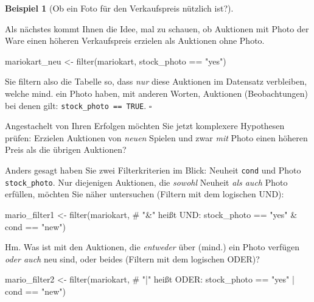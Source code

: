 \documentclass[
  letterpaper,
  twoside,
  open=any]{scrbook}
\newenvironment{Shaded}{\begin{snugshade}}{\end{snugshade}}
\newcommand{\CommentTok}[1]{\textcolor[rgb]{0.37,0.37,0.37}{#1}}
\newcommand{\FunctionTok}[1]{\textcolor[rgb]{0.28,0.35,0.67}{#1}}
\newcommand{\NormalTok}[1]{\textcolor[rgb]{0.00,0.23,0.31}{#1}}
\newcommand{\OtherTok}[1]{\textcolor[rgb]{0.00,0.23,0.31}{#1}}
\newcommand{\SpecialCharTok}[1]{\textcolor[rgb]{0.37,0.37,0.37}{#1}}
\newcommand{\StringTok}[1]{\textcolor[rgb]{0.13,0.47,0.30}{#1}}
\theoremstyle{definition}
\theoremstyle{definition}
\newtheorem{example}{Beispiel}[chapter]
\theoremstyle{definition}
\theoremstyle{remark}
\begin{document}
\begin{example}[Ob ein Foto für den Verkaufspreis nützlich
ist?]\protect\hypertarget{exm-filter}{}\label{exm-filter}

Als nächstes kommt Ihnen die Idee, mal zu schauen, ob Auktionen mit
Photo der Ware einen höheren Verkaufspreis erzielen als Auktionen ohne
Photo.

\begin{Shaded}
\begin{Highlighting}[]
\NormalTok{mariokart\_neu }\OtherTok{\textless{}{-}} \FunctionTok{filter}\NormalTok{(mariokart, stock\_photo }\SpecialCharTok{==} \StringTok{"yes"}\NormalTok{)}
\end{Highlighting}
\end{Shaded}

Sie filtern also die Tabelle so, dass \emph{nur} diese Auktionen im
Datensatz verbleiben, welche mind. ein Photo haben, mit anderen Worten,
Auktionen (Beobachtungen) bei denen gilt:
\texttt{stock\_photo\ ==\ TRUE}. \(\square\)

\end{example}

Angestachelt von Ihren Erfolgen möchten Sie jetzt komplexere Hypothesen
prüfen: Erzielen Auktionen von \emph{neuen} Spielen und zwar \emph{mit}
Photo einen höheren Preis als die übrigen Auktionen?

Anders gesagt haben Sie zwei Filterkriterien im Blick: Neuheit
\texttt{cond} und Photo \texttt{stock\_photo}. Nur diejenigen Auktionen,
die \emph{sowohl} Neuheit \emph{als auch} Photo erfüllen, möchten Sie
näher untersuchen (Filtern mit dem logischen UND):

\begin{Shaded}
\begin{Highlighting}[]
\NormalTok{mario\_filter1 }\OtherTok{\textless{}{-}} 
  \FunctionTok{filter}\NormalTok{(mariokart,  }\CommentTok{\# "\&" heißt UND:}
\NormalTok{         stock\_photo }\SpecialCharTok{==} \StringTok{"yes"} \SpecialCharTok{\&}\NormalTok{ cond }\SpecialCharTok{==} \StringTok{"new"}\NormalTok{)}
\end{Highlighting}
\end{Shaded}

Hm. Was ist mit den Auktionen, die \emph{entweder} über (mind.) ein
Photo verfügen \emph{oder auch} neu sind, oder beides (Filtern mit dem
logischen ODER)?

\begin{Shaded}
\begin{Highlighting}[]
\NormalTok{mario\_filter2 }\OtherTok{\textless{}{-}} 
  \FunctionTok{filter}\NormalTok{(mariokart,  }\CommentTok{\# "|" heißt ODER:}
\NormalTok{         stock\_photo }\SpecialCharTok{==} \StringTok{"yes"} \SpecialCharTok{|}\NormalTok{ cond }\SpecialCharTok{==} \StringTok{"new"}\NormalTok{)}
\end{Highlighting}
\end{Shaded}
\end{document}
